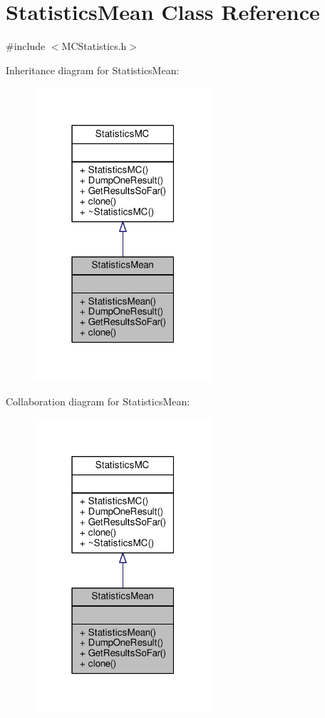 \hypertarget{classStatisticsMean}{}\section{Statistics\+Mean Class Reference}
\label{classStatisticsMean}


{\ttfamily \#include $<$M\+C\+Statistics.\+h$>$}



Inheritance diagram for Statistics\+Mean\+:
\nopagebreak
\begin{figure}[H]
\begin{center}
\leavevmode
\includegraphics[width=187pt]{classStatisticsMean__inherit__graph}
\end{center}
\end{figure}


Collaboration diagram for Statistics\+Mean\+:
\nopagebreak
\begin{figure}[H]
\begin{center}
\leavevmode
\includegraphics[width=187pt]{classStatisticsMean__coll__graph}
\end{center}
\end{figure}
